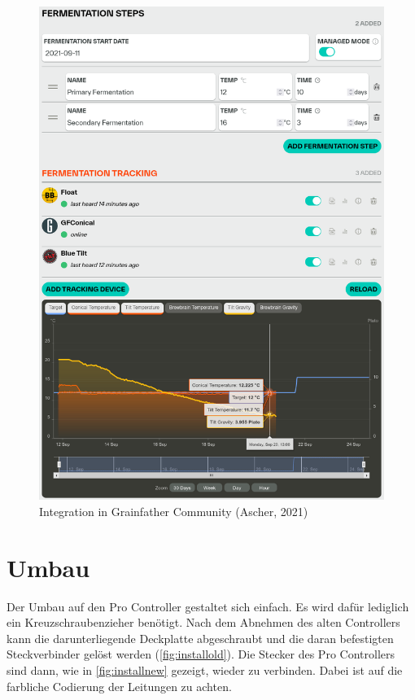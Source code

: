 \documentclass[a4paper,parskip=half]{scrartcl}
\begin{document}
\begin{figure}[H]
\centering
\includegraphics[width=14.4cm]{images/gfpc_integration.png}
\caption{Integration in Grainfather Community (Ascher, 2021)}
\label{fig:integration}
\end{figure}

\section*{Umbau}

Der Umbau auf den Pro Controller gestaltet sich einfach. Es
wird dafür lediglich ein Kreuzschraubenzieher benötigt.
Nach dem Abnehmen des alten Controllers kann die
darunterliegende Deckplatte abgeschraubt und die daran
befestigten Steckverbinder gelöst werden
(\autoref{fig:installold}). Die Stecker des
Pro Controllers sind dann, wie in \autoref{fig:installnew}
gezeigt, wieder zu verbinden. Dabei ist auf die farbliche
Codierung der Leitungen zu achten.
\end{document}
